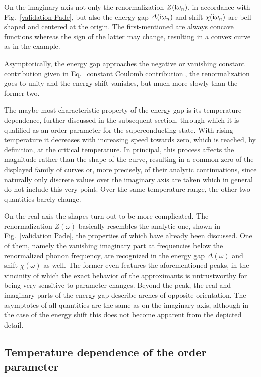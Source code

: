 On the imaginary-axis not only the renormalization $Z(\mathrm i \omega_n)$, in
accordance with Fig.~\ref{validation Pade}, but also the energy gap $\varDelta(\mathrm i
\omega_n)$ and shift $\chi(\mathrm i \omega_n)$ are bell-shaped and centered at the
origin. The first-mentioned are always concave functions whereas the sign of
the latter may change, resulting in a convex curve as in the example.

Asymptotically, the energy gap approaches the negative or vanishing constant
 contribution given in Eq.~\ref{constant Coulomb contribution},
the renormalization goes to unity and the energy shift vanishes, but much more
slowly than the former two.

The maybe most characteristic property of the energy gap is its temperature
dependence, further discussed in the subsequent section, through which it is
qualified as an order parameter for the superconducting state. With rising
temperature it decreases with increasing speed towards zero, which is reached,
by definition, at the critical temperature. In principal, this process affects
the magnitude rather than the shape of the curve, resulting in a common zero of
the displayed family of curves or, more precisely, of their analytic
continuations, since naturally only discrete values over the imaginary axis are
taken which in general do not include this very point. Over the same temperature
range, the other two quantities barely change.

On the real axis the shapes turn out to be more complicated. The renormalization
$Z(\omega)$ basically resembles the analytic one, shown in Fig.~\ref{validation
Pade}, the properties of which have already been discussed. One of them, namely
the vanishing imaginary part at frequencies below the renormalized phonon
frequency, are recognized in the energy gap $\Delta(\omega)$ and shift
$\chi(\omega)$ as well. The former even features the aforementioned peaks, in
the vincinity of which the exact behavior of the  approximants is
untrustworthy for being very sensitive to parameter changes. Beyond the peak,
the real and imaginary parts of the energy gap describe arches of opposite
orientation. The asymptotes of all quantities are the same as on the
imaginary-axis, although in the case of the energy shift this does not become
apparent from the depicted detail.

\subsection{Temperature dependence of the order parameter}
\label{temperature dependence of the order parameter}

